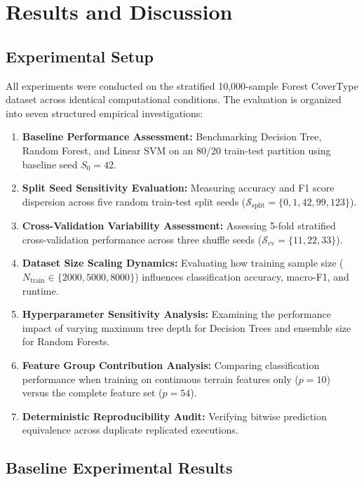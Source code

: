 \chapter{Results and Discussion}
\label{ch:results}

\section{Experimental Setup}
\label{sec:exp_setup}

All experiments were conducted on the stratified 10,000-sample Forest CoverType dataset across identical computational conditions. The evaluation is organized into seven structured empirical investigations:
\begin{enumerate}
    \item \textbf{Baseline Performance Assessment:} Benchmarking Decision Tree, Random Forest, and Linear SVM on an 80/20 train-test partition using baseline seed $S_0 = 42$.
    \item \textbf{Split Seed Sensitivity Evaluation:} Measuring accuracy and F1 score dispersion across five random train-test split seeds ($\mathcal{S}_{\text{split}} = \{0, 1, 42, 99, 123\}$).
    \item \textbf{Cross-Validation Variability Assessment:} Assessing 5-fold stratified cross-validation performance across three shuffle seeds ($\mathcal{S}_{\text{cv}} = \{11, 22, 33\}$).
    \item \textbf{Dataset Size Scaling Dynamics:} Evaluating how training sample size ($N_{\text{train}} \in \{2000, 5000, 8000\}$) influences classification accuracy, macro-F1, and runtime.
    \item \textbf{Hyperparameter Sensitivity Analysis:} Examining the performance impact of varying maximum tree depth for Decision Trees and ensemble size for Random Forests.
    \item \textbf{Feature Group Contribution Analysis:} Comparing classification performance when training on continuous terrain features only ($p=10$) versus the complete feature set ($p=54$).
    \item \textbf{Deterministic Reproducibility Audit:} Verifying bitwise prediction equivalence across duplicate replicated executions.
\end{enumerate}

\section{Baseline Experimental Results}
\label{sec:baseline_results}


